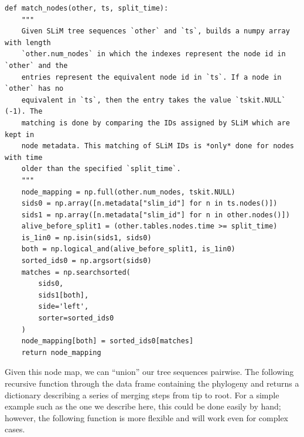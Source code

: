 \documentclass[12pt]{article}
\begin{document}
\begin{verbatim}
def match_nodes(other, ts, split_time):
    """
    Given SLiM tree sequences `other` and `ts`, builds a numpy array with length
    `other.num_nodes` in which the indexes represent the node id in `other` and the
    entries represent the equivalent node id in `ts`. If a node in `other` has no
    equivalent in `ts`, then the entry takes the value `tskit.NULL` (-1). The
    matching is done by comparing the IDs assigned by SLiM which are kept in
    node metadata. This matching of SLiM IDs is *only* done for nodes with time
    older than the specified `split_time`.
    """
    node_mapping = np.full(other.num_nodes, tskit.NULL)
    sids0 = np.array([n.metadata["slim_id"] for n in ts.nodes()])
    sids1 = np.array([n.metadata["slim_id"] for n in other.nodes()])
    alive_before_split1 = (other.tables.nodes.time >= split_time)
    is_1in0 = np.isin(sids1, sids0)
    both = np.logical_and(alive_before_split1, is_1in0)
    sorted_ids0 = np.argsort(sids0)
    matches = np.searchsorted(
        sids0,
        sids1[both],
        side='left',
        sorter=sorted_ids0
    )
    node_mapping[both] = sorted_ids0[matches]
    return node_mapping
\end{verbatim}

Given this node map, we can ``union'' our tree sequences pairwise. The following recursive function through the data frame containing the phylogeny and returns a dictionary
describing a series of merging steps from tip to root. For a simple example such as the one we describe here, this could be done easily by hand; however, the following function
is more flexible and will work even for complex cases.
\end{document}
